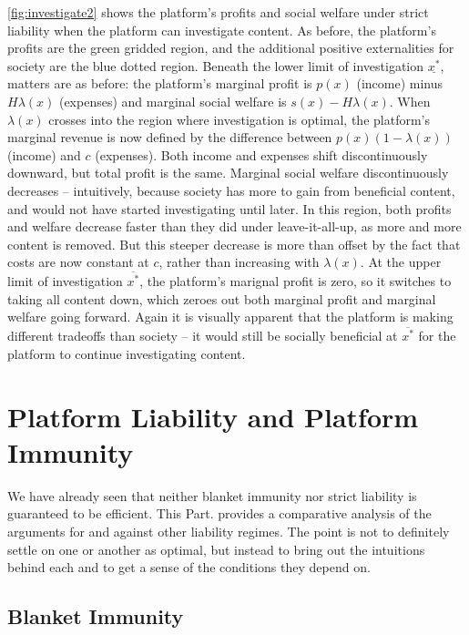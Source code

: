 \autoref{fig:investigate2} shows the platform's profits and social welfare under strict liability when the platform can investigate content. As before, the platform's profits are the green gridded region, and the additional positive externalities for society are the blue dotted region. Beneath the lower limit of investigation $\underline{x^*}$, matters are as before: the platform's marginal profit is $p(x)$ (income) minus $H\lambda(x)$ (expenses) and marginal social welfare is $s(x) - H\lambda(x)$. When $\lambda(x)$ crosses into the region where investigation is optimal, the platform's marginal revenue is now defined by the difference between $p(x)(1 - \lambda(x))$ (income) and $c$ (expenses). Both income and expenses shift discontinuously downward, but total profit is the same. Marginal social welfare discontinuously decreases -- intuitively, because society has more to gain from beneficial content, and would not have started investigating until later. In this region, both profits and welfare decrease faster than they did under leave-it-all-up, as more and more content is removed. But this steeper decrease is more than offset by the fact that costs are now constant at $c$, rather than increasing with $\lambda(x)$. At the upper limit of investigation $\overline{x^*}$, the platform's marignal profit is zero, so it switches to taking all content down, which zeroes out both marginal profit and marginal welfare going forward. Again it is visually apparent that the platform is making different tradeoffs than society -- it would still be socially beneficial at $\overline{x^*}$ for the platform to continue investigating content.




\section{Platform Liability and Platform Immunity}
\label{sec:liability}

We have already seen that neither blanket immunity nor strict liability is guaranteed to be efficient. This Part. provides a comparative analysis of the arguments for and against other liability regimes. The point is not to definitely settle on one or another as optimal, but instead to bring out the intuitions behind each and to get a sense of the conditions they depend on.



\subsection{Blanket Immunity}

